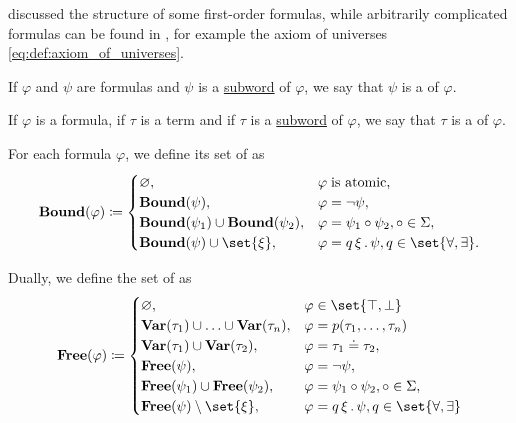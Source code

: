 \begin{definition}
\begin{thmenum}
     discussed the structure of some first-order formulas, while arbitrarily complicated formulas can be found in , for example the axiom of universes \eqref{eq:def:axiom_of_universes}.

     If \( \varphi \) and \( \psi \) are formulas and \( \psi \) is a \hyperref[def:formal_language/subword]{subword} of \( \varphi \), we say that \( \psi \) is a  of \( \varphi \).

     If \( \varphi \) is a formula, if \( \tau \) is a term and if \( \tau \) is a \hyperref[def:formal_language/subword]{subword} of \( \varphi \), we say that \( \tau \) is a  of \( \varphi \).

     For each formula \( \varphi \), we define its set of  as
    \begin{equation}\label{eq:def:first_order_syntax/formula_bound_variables}
      \boldop{Bound}(\varphi) \coloneqq \begin{cases}
        \varnothing,                                        &\varphi \T{is atomic,} \\
        \boldop{Bound}(\psi),                               &\varphi = \neg \psi, \\
        \boldop{Bound}(\psi_1) \cup \boldop{Bound}(\psi_2), &\varphi = \psi_1 \bincirc \psi_2, \bincirc \in \Sigma, \\
        \boldop{Bound}(\psi) \cup \set{ \xi },              &\varphi = \quantifier{q}{\xi} \psi, q \in \set{ \forall, \exists }.
      \end{cases}
    \end{equation}

     Dually, we define the set of  as
    \begin{equation}\label{eq:def:first_order_syntax/formula_free_variables}
      \boldop{Free}(\varphi) \coloneqq \begin{cases}
        \varnothing,                                                &\varphi \in \set{ \top, \bot } \\
        \boldop{Var}(\tau_1) \cup \ldots \cup \boldop{Var}(\tau_n), &\varphi = p(\tau_1, \ldots, \tau_n) \\
        \boldop{Var}(\tau_1) \cup \boldop{Var}(\tau_2),             &\varphi = \tau_1 \doteq \tau_2, \\
        \boldop{Free}(\psi),                                        &\varphi = \neg \psi, \\
        \boldop{Free}(\psi_1) \cup \boldop{Free}(\psi_2),           &\varphi = \psi_1 \bincirc \psi_2, \bincirc \in \Sigma, \\
        \boldop{Free}(\psi) \setminus \set{ \xi },                  &\varphi = \quantifier{q}{\xi} \psi, q \in \set{ \forall, \exists }
      \end{cases}
    \end{equation}


\end{thmenum}
\end{definition}
